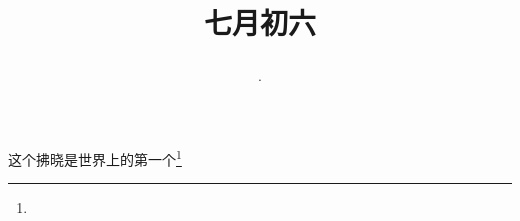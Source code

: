 \title{\date[d=9,m=8,y=2024][year:cn-y,年,month:cn,day:cn,日,·,weekday]·七月初六 }
这个拂晓是世界上的第一个\footnote{ }

